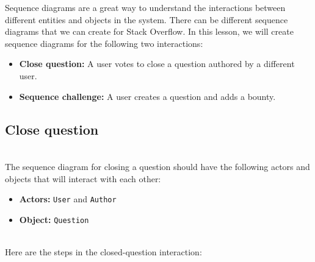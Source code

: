 

Sequence diagrams are a great way to understand the interactions between different entities and objects in the system. There can be different sequence diagrams that we can create for Stack Overflow. In this lesson, we will create sequence diagrams for the following two interactions:

\begin{itemize}
\item
\protect{}\label{wUElxVdZvWzYsiOqk_15C}
\textbf{Close question:} A user votes to close a question authored by a different user.
\item
\protect{}\label{ip5KPpK-MsuRETat0_vdb}
\textbf{Sequence challenge:} A user creates a question and adds a bounty.
\end{itemize}

\subsection{Close question}\label{cjErOWWT4x6R7sXauyPW2}
\\
The sequence diagram for closing a question should have the following actors and objects that will interact with each other:

\begin{itemize}
\item
\protect{}\label{ypniRu1d3KSzX-oQQjdB-}
\textbf{Actors:} \texttt{User} and \texttt{Author}
\item
\protect{}\label{sCfb4BbleY_RknEvLc47a}
\textbf{Object:} \texttt{Question}
\end{itemize}
\\
Here are the steps in the closed-question interaction:

